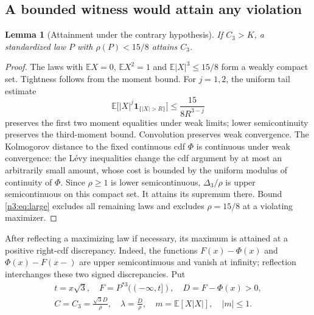 \documentclass[11pt,a4paper]{article}
\numberwithin{equation}{section}
\newtheorem{lemma}[theorem]{Lemma}
\theoremstyle{definition}
\theoremstyle{remark}
\newcommand{\E}{\mathbb E}
\newcommand{\one}{\mathbf 1}
\begin{document}
\subsection{A bounded witness would attain any violation}
\begin{lemma}[Attainment under the contrary hypothesis]\label{n3:lem:attain}
If $C_3>K$, a standardized law $P$ with $\rho(P)<15/8$ attains $C_3$.
\end{lemma}
\begin{proof}
The laws with $\E X=0$, $\E X^2=1$ and $\E|X|^3\le15/8$ form a weakly
compact set. Tightness follows from the moment bound. For $j=1,2$, the
uniform tail estimate
\[
 \E\bigl[|X|^j\one_{\{|X|>R\}}\bigr]\le\frac{15}{8R^{3-j}}
\]
preserves the first two moment equalities under weak limits; lower
semicontinuity preserves the third-moment bound. Convolution preserves weak
convergence. The Kolmogorov distance to the fixed continuous cdf $\Phi$ is
continuous under weak convergence: the L\'evy inequalities change the cdf
argument by at most an arbitrarily small amount, whose cost is bounded by
the uniform modulus of continuity of $\Phi$. Since $\rho\ge1$ is lower
semicontinuous, $\Delta_3/\rho$ is upper semicontinuous on this compact set.
It attains its supremum there. Bound \eqref{n3:eq:large} excludes all remaining
laws and excludes $\rho=15/8$ at a violating maximizer.
\end{proof}
After reflecting a maximizing law if necessary, its maximum is attained
at a positive right-cdf discrepancy. Indeed, the functions
$F(x)-\Phi(x)$ and $\Phi(x)-F(x-)$ are upper semicontinuous and vanish at
infinity; reflection interchanges these two signed discrepancies. Put
\[
 \begin{gathered}
 t=x\sqrt3,\quad F=P^{*3}(( -\infty,t]),\quad D=F-\Phi(x)>0,\\
 C=C_3=\frac{\sqrt3D}{\rho},\quad \lambda=\frac D\rho,
 \quad m=\E[X|X|],\quad |m|\le1.
 \end{gathered}
\]
\end{document}
